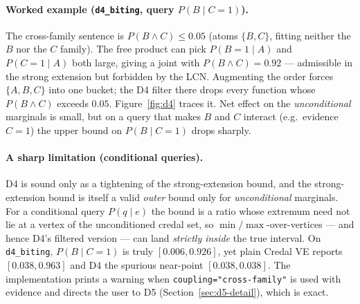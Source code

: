 \documentclass[11pt]{article}
\begin{document}
\paragraph{Worked example (\texttt{d4\_biting}, query $P(B\mid C{=}1)$).} The cross-family
sentence is $P(B\land C)\le 0.05$ (atoms $\{B,C\}$, fitting neither the $B$ nor the $C$
family). The free product can pick $P(B{=}1\mid A)$ and $P(C{=}1\mid A)$ both large, giving a
joint with $P(B\land C)=0.92$ --- admissible in the strong extension but forbidden by the
LCN. Augmenting the order forces $\{A,B,C\}$ into one bucket; the D4 filter there drops every
function whose $P(B\land C)$ exceeds $0.05$. Figure~\ref{fig:d4} traces it. Net effect on the
\emph{unconditional} marginals is small, but on a query that makes $B$ and $C$ interact
(e.g.\ evidence $C{=}1$) the upper bound on $P(B\mid C{=}1)$ drops sharply.

\paragraph{A sharp limitation (conditional queries).} D4 is sound only as a tightening of the
strong-extension bound, and the strong-extension bound is itself a valid \emph{outer} bound
only for \emph{unconditional} marginals. For a conditional query $P(q\mid e)$ the bound is a
ratio whose extremum need not lie at a vertex of the unconditioned credal set, so
$\min/\max$-over-vertices --- and hence D4's filtered version --- can land \emph{strictly
inside} the true interval. On \texttt{d4\_biting}, $P(B\mid C{=}1)$ is truly $[0.006,0.926]$,
yet plain Credal VE reports $[0.038,0.963]$ and D4 the spurious near-point $[0.038,0.038]$.
The implementation prints a warning when \texttt{coupling="cross-family"} is used with
evidence and directs the user to D5 (Section~\ref{sec:d5-detail}), which is exact.
\end{document}
